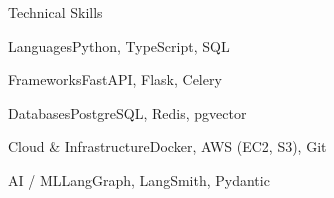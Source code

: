\documentclass[
	11pt
]{../../../template}
\begin{document}
	\begin{rSection}{T}{echnical Skills}
		\begin{rSet}{Languages}{Python, TypeScript, SQL}
		\end{rSet}
		\begin{rSet}{Frameworks}{FastAPI, Flask, Celery}
		\end{rSet}
		\begin{rSet}{Databases}{PostgreSQL, Redis, pgvector}
		\end{rSet}
		\begin{rSet}{Cloud \& Infrastructure}{Docker, AWS (EC2, S3), Git}
		\end{rSet}
		\begin{rSet}{AI / ML}{LangGraph, LangSmith, Pydantic}
		\end{rSet}
	\end{rSection}
\end{document}
